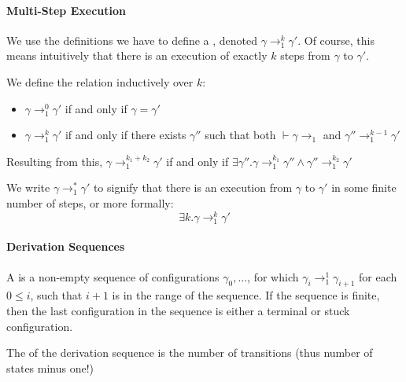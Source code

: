 \paragraph{Multi-Step Execution}
We use the definitions we have to define a , denoted $\gamma \rightarrow_1^k \gamma'$.
Of course, this means intuitively that there is an execution of exactly $k$ steps from $\gamma$ to $\gamma'$.

We define the relation inductively over $k$:
\begin{itemize}
    \item $\gamma \rightarrow_1^0 \gamma'$ if and only if $\gamma = \gamma'$
    \item $\gamma \rightarrow_1^k \gamma'$ if and only if there exists $\gamma''$ such that both $\vdash \gamma \rightarrow_1$ and $\gamma'' \rightarrow_1^{k - 1} \gamma'$
\end{itemize}
Resulting from this, $\gamma \rightarrow_1^{k_1 + k_2} \gamma'$ if and only if $\exists \gamma'' . \gamma \rightarrow_1^{k_1} \gamma'' \land \gamma'' \rightarrow_1^{k_2} \gamma'$

We write $\gamma \rightarrow_1^* \gamma'$ to signify that there is an execution from $\gamma$ to $\gamma'$ in some finite number of steps, or more formally:
\[
    \exists k. \gamma \rightarrow_1^k \gamma'
\]


\paragraph{Derivation Sequences}
\inlinedefinition A  is a non-empty sequence of configurations $\gamma_0, \ldots$, for which $\gamma_i \rightarrow_1^1 \gamma_{i + 1}$ for each $0 \leq i$,
such that $i + 1$ is in the range of the sequence. If the sequence is finite, then the last configuration in the sequence is either a terminal or stuck configuration.

The  of the derivation sequence is the number of transitions (thus number of states minus one!)
